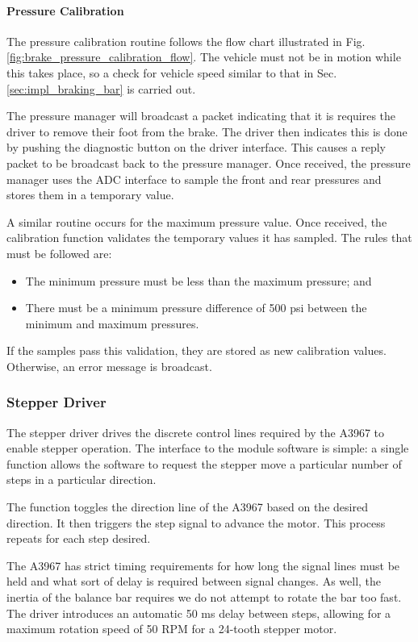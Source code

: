 \paragraph{Pressure Calibration}

The pressure calibration routine follows the flow chart illustrated in Fig. \ref{fig:brake_pressure_calibration_flow}. The vehicle must not be in motion while this takes place, so a check for vehicle speed similar to that in Sec. \ref{sec:impl_braking_bar} is carried out. 

The pressure manager will broadcast a packet indicating that it is requires the driver to remove their foot from the brake. The driver then indicates this is done by pushing the diagnostic button on the driver interface. This causes a reply packet to be broadcast back to the pressure manager. Once received, the pressure manager uses the ADC interface to sample the front and rear pressures and stores them in a temporary value.

A similar routine occurs for the maximum pressure value. Once received, the calibration function validates the temporary values it has sampled. The rules that must be followed are:

\begin{itemize}
\item The minimum pressure must be less than the maximum pressure; and
\item There must be a minimum pressure difference of 500 psi between the minimum and maximum pressures.
\end{itemize}

If the samples pass this validation, they are stored as new calibration values. Otherwise, an error message is broadcast.

\subsubsection{Stepper Driver}

The stepper driver drives the discrete control lines required by the A3967 to enable stepper operation. The interface to the module software is simple: a single function allows the software to request the stepper move a particular number of steps in a particular direction.

The function toggles the direction line of the A3967 based on the desired direction. It then triggers the step signal to advance the motor. This process repeats for each step desired. 

The A3967 has strict timing requirements for how long the signal lines must be held and what sort of delay is required between signal changes. As well, the inertia of the balance bar requires we do not attempt to rotate the bar too fast. The driver introduces an automatic 50 ms delay between steps, allowing for a maximum rotation speed of 50 RPM for a 24-tooth stepper motor.
